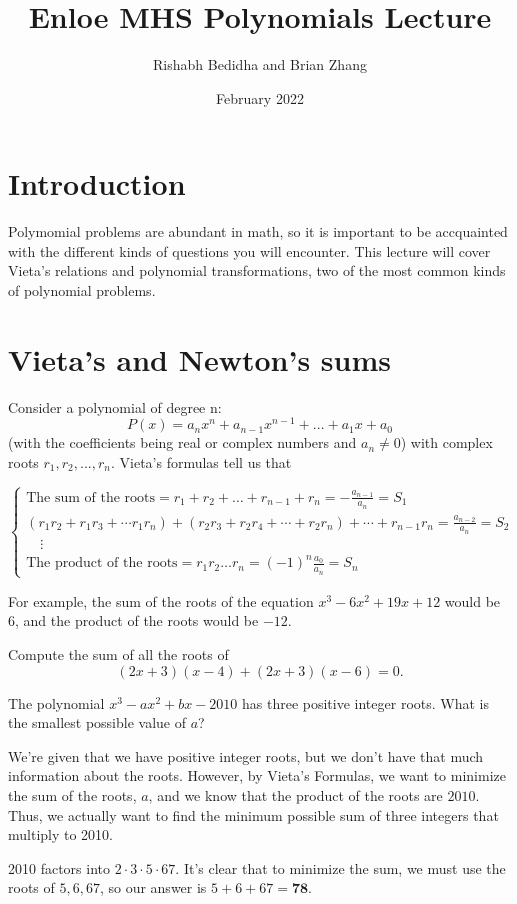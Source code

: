 \documentclass[sexy]{scrartcl}
\title{Enloe MHS Polynomials Lecture}
\author{Rishabh Bedidha and Brian Zhang}
\date{February 2022}
\newcommand{\ansbold}[1]{\mathbf{#1}}
\begin{document}
\maketitle

\section{Introduction}
Polymomial problems are abundant in math, so it is important to be accquainted with the different kinds of questions you will encounter. This lecture will cover Vieta's relations and polynomial transformations, two of the most common kinds of polynomial problems.

\section{Vieta's and Newton's sums}
\begin{theorem}
Consider a polynomial of degree n:
$$P(x)=a_{n}x^{n}+a_{n-1}x^{n-1}+...+a_{1}x+a_{0}$$ 
(with the coefficients being real or complex numbers and $a_n \neq 0$) with complex roots $r_1, r_2, ..., r_n$. Vieta's formulas tell us that 

\noindent
$\begin{cases}
\text{The sum of the roots}=r_{1}+r_{2}+\dots +r_{n-1}+r_{n}=-\frac {a_{n-1}}{a_{n}}=S_{1} \\ 
(r_{1}r_{2}+r_{1}r_{3}+\cdots r_{1}r_{n})+(r_{2}r_{3}+r_{2}r_{4}+\cdots +r_{2}r_{n})+\cdots +r_{n-1}r_{n}={\frac {a_{n-2}}{a_{n}}}=S_{2}\\
\quad \vdots \\ 
\text{The product of the roots} =r_{1}r_{2}\dots r_{n}=(-1)^{n}{\frac {a_{0}}{a_{n}}}=S_n
\end{cases}$
\end{theorem}
For example, the sum of the roots of the equation $x^3-6x^2+19x+12$ would be 6, and the product of the roots would be $-12$. 

\begin{exercise}[2002 AMC 10A] Compute the sum of all the roots of $$(2x+3)(x-4)+(2x+3)(x-6)=0.$$
\end{exercise}

\begin{example}[2010 AMC 10A]
The polynomial $x^3-ax^2+bx-2010$ has three positive integer roots. What is the smallest possible value of $a$?
\end{example}
\begin{soln}
We're given that we have positive integer roots, but we don't have that much information about the roots. However, by Vieta's Formulas, we want to minimize the sum of the roots, $a$, and we know that the product of the roots are $2010$. Thus, we actually want to find the minimum possible sum of three integers that multiply to 2010. 

2010 factors into $2\cdot 3\cdot 5\cdot 67$. It's clear that to minimize the sum, we must use the roots of $5, 6, 67$, so our answer is $5+6+67=\ansbold{78}$.
\end{soln}
\end{document}
